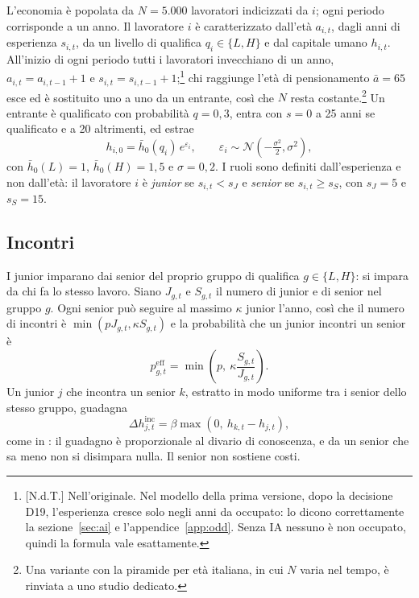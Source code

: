 \documentclass[preprint,12pt,authoryear]{elsarticle}
\newcommand{\ndt}[1]{\footnote{[N.d.T.] #1}}
\begin{document}
L'economia è popolata da $N=5.000$ lavoratori indicizzati da $i$; ogni periodo corrisponde a un anno. Il lavoratore $i$ è caratterizzato dall'età $a_{i,t}$, dagli anni di esperienza $s_{i,t}$, da un livello di qualifica $q_i\in\{L,H\}$ e dal capitale umano $h_{i,t}$. All'inizio di ogni periodo tutti i lavoratori invecchiano di un anno, $a_{i,t}=a_{i,t-1}+1$ e $s_{i,t}=s_{i,t-1}+1$;\ndt{Nell'originale. Nel modello della prima versione, dopo la decisione D19, l'esperienza cresce solo negli anni da occupato: lo dicono correttamente la sezione~\ref{sec:ai} e l'appendice~\ref{app:odd}. Senza IA nessuno è non occupato, quindi la formula vale esattamente.} chi raggiunge l'età di pensionamento $\bar a=65$ esce ed è sostituito uno a uno da un entrante, così che $N$ resta costante.\footnote{Una variante con la piramide per età italiana, in cui $N$ varia nel tempo, è rinviata a uno studio dedicato.} Un entrante è qualificato con probabilità $q=0{,}3$, entra con $s=0$ a 25 anni se qualificato e a 20 altrimenti, ed estrae
\begin{equation}\label{eq:entry}
h_{i,0} = \bar h_0(q_i)\, e^{\varepsilon_i}, \qquad \varepsilon_i \sim \mathcal N\!\left(-\tfrac{\sigma^2}{2},\sigma^2\right),
\end{equation}
con $\bar h_0(L)=1$, $\bar h_0(H)=1{,}5$ e $\sigma=0{,}2$. I ruoli sono definiti dall'esperienza e non dall'età: il lavoratore $i$ è \emph{junior} se $s_{i,t} < s_J$ e \emph{senior} se $s_{i,t} \ge s_S$, con $s_J=5$ e $s_S=15$.

\subsection{Incontri}

I junior imparano dai senior del proprio gruppo di qualifica $g\in\{L,H\}$: si impara da chi fa lo stesso lavoro. Siano $J_{g,t}$ e $S_{g,t}$ il numero di junior e di senior nel gruppo $g$. Ogni senior può seguire al massimo $\kappa$ junior l'anno, così che il numero di incontri è $\min(pJ_{g,t},\kappa S_{g,t})$ e la probabilità che un junior incontri un senior è
\begin{equation}\label{eq:peff}
p^{\mathrm{eff}}_{g,t} = \min\!\left(p,\ \kappa \frac{S_{g,t}}{J_{g,t}}\right).
\end{equation}
Un junior $j$ che incontra un senior $k$, estratto in modo uniforme tra i senior dello stesso gruppo, guadagna
\begin{equation}\label{eq:meeting}
\Delta h^{\mathrm{inc}}_{j,t} = \beta \max\left(0,\ h_{k,t}-h_{j,t}\right),
\end{equation}
come in \citet{LucasMoll2014}: il guadagno è proporzionale al divario di conoscenza, e da un senior che sa meno non si disimpara nulla. Il senior non sostiene costi.
\end{document}

